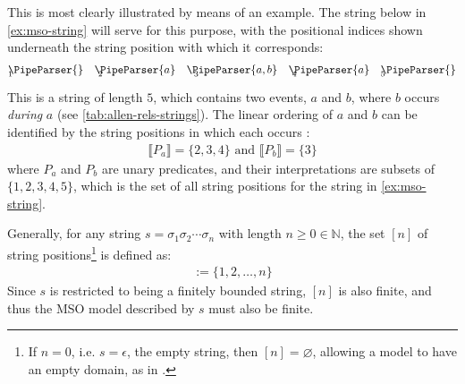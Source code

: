 \documentclass[a4paper,12pt,leqno,twoside]{article}
\newcommand{\vph}[1]{\vphantom{#1}}
\newcommand{\ebox}[1]{\fbox{$\vph{'(),}#1$}}
\renewcommand{\emptyset}{\varnothing}
\newcommand{\EventString}[1]{%
	\renewcommand*{\do}[1]{\ebox{##1}}%
	\PipeParser{#1}%
}
\begin{document}
This is most clearly illustrated by means of an example. The string below in \cref{ex:mso-string} will serve for this purpose, with the positional indices shown underneath the string position with which it corresponds:
\begin{alignat}{5}\label{ex:mso-string}
	&\EventString{{}} && \EventString{a} && \EventString{a,b} && \EventString{a} && \EventString{{}}\\[-1.2em]
	&{\scriptstyle 1} && {\scriptstyle ~2} && {\scriptstyle ~~3} && {\scriptstyle ~4} && {\scriptstyle 5}\notag
\end{alignat}
This is a string of length $5$, which contains two events, $a$ and $b$, where $b$ occurs \textit{during} $a$ (see \cref{tab:allen-rels-strings}). The linear ordering of $a$ and $b$ can be identified by the string positions in which each occurs \citep{fernando2016regular,Fernando2018}:
\begin{align}
	\llbracket P_a \rrbracket = \{2,3,4\} \text{ and } \llbracket P_b \rrbracket = \{3\}
\end{align}
where $P_a$ and $P_b$ are unary predicates, and their interpretations are subsets of $\{1,2,3,4,5\}$, which is the set of all string positions for the string in \cref{ex:mso-string}.

Generally, for any string $s = \sigma_1\sigma_2\cdots\sigma_n$ with length $n \ge 0 \in \mathbb{N}$, the set $[n]$ of string positions\footnote{If $n = 0$, i.e. $s = \epsilon$, the empty string, then $[n] = \emptyset$, allowing a model to have an empty domain, as in \citet{Libkin2004}.} is defined as:
\begin{align}
	[n] := \{1,2,\ldots,n\}
\end{align}
Since $s$ is restricted to being a finitely bounded string, $[n]$ is also finite, and thus the MSO model described by $s$ must also be finite.
\end{document}
